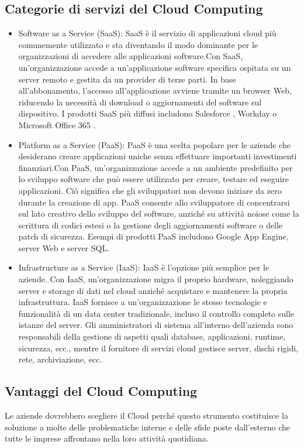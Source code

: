 \subsection{Categorie di servizi del Cloud Computing}
\begin{itemize}
\item Software as a Service (SaaS): SaaS è il servizio di applicazioni cloud più comunemente utilizzato e sta diventando il modo dominante per le organizzazioni di accedere alle applicazioni software.Con SaaS, un'organizzazione accede a un'applicazione software specifica ospitata su un server remoto e gestita da un provider di terze parti. In base all'abbonamento, l'accesso all'applicazione avviene tramite un browser Web, riducendo la necessità di download o aggiornamenti del software sul dispositivo. I prodotti SaaS più diffusi includono  Salesforce ,  Workday o  Microsoft Office 365 .
\item Platform as a Service (PaaS): PaaS è una scelta popolare per le aziende che desiderano creare applicazioni uniche senza effettuare importanti investimenti finanziari.Con PaaS, un'organizzazione accede a un ambiente predefinito per lo sviluppo software che può essere utilizzato per creare, testare ed eseguire applicazioni. Ciò significa che gli sviluppatori non devono iniziare da zero durante la creazione di app. PaaS consente allo sviluppatore di concentrarsi sul lato creativo dello sviluppo del software, anziché su attività noiose come la scrittura di codici estesi o la gestione degli aggiornamenti software o delle patch di sicurezza. Esempi di prodotti PaaS includono Google App Engine, server Web e server SQL.
\item Infrastructure as a Service (IaaS): IaaS è l'opzione più semplice per le aziende. Con IaaS, un'organizzazione migra il proprio hardware, noleggiando server e storage di dati nel cloud anziché acquistare e mantenere la propria infrastruttura.
IaaS fornisce a un'organizzazione le stesse tecnologie e funzionalità di un data center tradizionale, incluso il controllo completo sulle istanze del server. Gli amministratori di sistema all'interno dell'azienda sono responsabili della gestione di aspetti quali database, applicazioni, runtime, sicurezza, ecc., mentre il fornitore di servizi cloud gestisce server, dischi rigidi, rete, archiviazione, ecc.  \cite{servizi_cloud}
\end{itemize}
\subsection{Vantaggi del Cloud Computing}
\cite{vantaggi_cloud}
Le aziende dovrebbero scegliere il Cloud perché questo strumento costituisce la soluzione a molte delle problematiche interne e delle sfide poste dall’esterno che tutte le imprese affrontano nella loro attività quotidiana.

